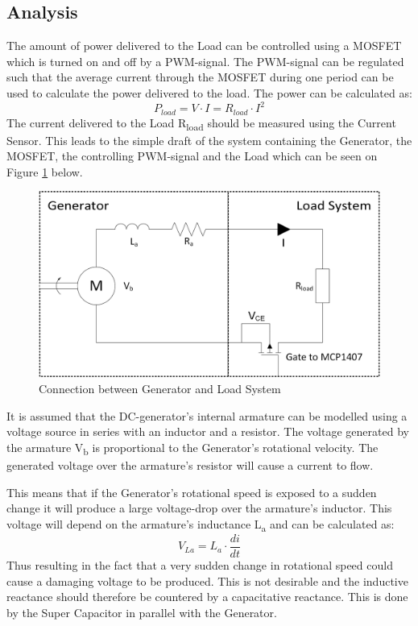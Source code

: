 \subsection{Analysis}
\label{sec:LoadSystemAnalysis}
The amount of power delivered to the Load can be controlled using a MOSFET which is turned on and off by a PWM-signal. The PWM-signal can be regulated such that the average current through the MOSFET during one period can be used to calculate the power delivered to the load. The power can be calculated as:
\begin{equation}
	P_{load} = V \cdot I = R_{load} \cdot I^2
\end{equation}
The current delivered to the Load R\textsubscript{load} should be measured using the Current Sensor. This leads to the simple draft of the system containing the Generator, the MOSFET, the controlling PWM-signal and the Load which can be seen on Figure \ref{fig:Load_System} below.

\begin{figure}[H]
	\centering
	\includegraphics[width=0.7\linewidth]{Hardware/Pictures/LoadSystem}
	\caption{Connection between Generator and Load System}
	\label{fig:Load_System}
\end{figure}

It is assumed that the DC-generator's internal armature can be modelled using a voltage source in series with an inductor and a resistor. The voltage generated by the armature V\textsubscript{b} is proportional to the Generator's rotational velocity. The generated voltage over the armature's resistor will cause a current to flow.

This means that if the Generator's rotational speed is exposed to a  sudden change it will produce a large voltage-drop over the armature's inductor. This voltage will depend on the armature's inductance L\textsubscript{a} and can be calculated as:
\begin{equation}
	V_{La} = L_a \cdot \frac{di}{dt}
\end{equation}
Thus resulting in the fact that a very sudden change in rotational speed could cause a damaging voltage to be produced. This is not desirable and the inductive reactance should therefore be countered by a capacitative reactance. This is done by the Super Capacitor in parallel with the Generator.